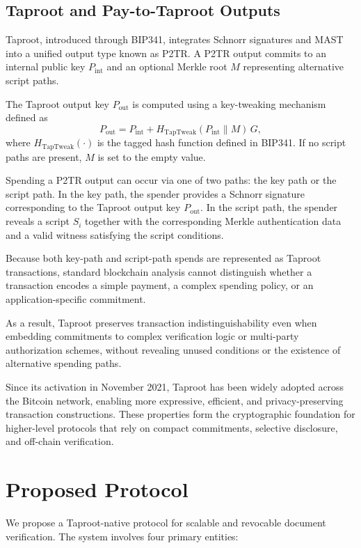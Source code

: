 \documentclass[preprint,12pt]{elsarticle}
\begin{document}
\subsection{Taproot and Pay-to-Taproot Outputs}

Taproot, introduced through BIP341, integrates Schnorr signatures and MAST into a unified output type known as P2TR.
A P2TR output commits to an internal public key $P_{\text{int}}$ and an optional Merkle root $M$ representing alternative script paths.

The Taproot output key $P_{\text{out}}$ is computed using a key-tweaking mechanism defined as
\[
P_{\text{out}} = P_{\text{int}} + H_{\text{TapTweak}}(P_{\text{int}} \parallel M)\,G,
\]
where $H_{\text{TapTweak}}(\cdot)$ is the tagged hash function defined in BIP341.
If no script paths are present, $M$ is set to the empty value.

Spending a P2TR output can occur via one of two paths: the key path or the script path.
In the key path, the spender provides a Schnorr signature corresponding to the Taproot output key $P_{\text{out}}$.
In the script path, the spender reveals a script $S_i$ together with the corresponding Merkle authentication data and a valid witness satisfying the script conditions.

Because both key-path and script-path spends are represented as Taproot transactions, standard blockchain analysis cannot distinguish whether a transaction encodes a simple payment, a complex spending policy, or an application-specific commitment.

As a result, Taproot preserves transaction indistinguishability even when embedding commitments to complex verification logic or multi-party authorization schemes, without revealing unused conditions or the existence of alternative spending paths.

Since its activation in November 2021, Taproot has been widely adopted across the Bitcoin network, enabling more expressive, efficient, and privacy-preserving transaction constructions.
These properties form the cryptographic foundation for higher-level protocols that rely on compact commitments, selective disclosure, and off-chain verification.



\section{Proposed Protocol}
\label{sec.proposedwork}
We propose a Taproot-native protocol for scalable and revocable document verification.
The system involves four primary entities:
\end{document}
